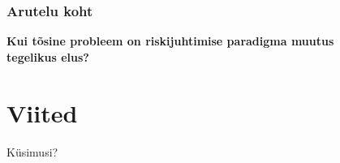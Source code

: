 \begin{frame}[fragile]
  \frametitle{Arutelu koht}
		\begin{center}
			\textbf{Kui tõsine probleem on riskijuhtimise paradigma muutus \\tegelikus elus?}
		\end{center}
\end{frame}


\section{Viited}

\begin{frame}[t,allowframebreaks,]
  	
	 

\end{frame}

\begin{frame}[plain]
	\begin{center}Küsimusi?\end{center}
\end{frame}



